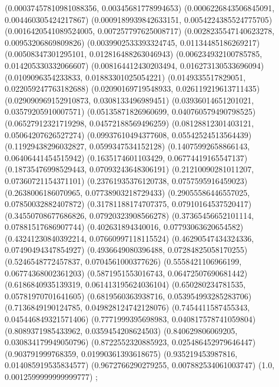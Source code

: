 {\begin{scope}[#1]
{    (0.00037457810981088356, 0.00345681778994653)
    (0.0006226843506845091, 0.004460305424217867)
    (0.0009189939842633151, 0.0054224385524775705)
    (0.0016420541089524005, 0.007257797625008717)
    (0.0028235547140623278, 0.00953206869809826)
    (0.0039902533393324745, 0.01134485186269217)
    (0.00508347301295101, 0.012816488263046943)
    (0.006234932100785785, 0.014205330332066607)
    (0.008164412430203494, 0.016273130533696094)
    (0.0109096354233833, 0.01883301025054221)
    (0.0149335517829051, 0.022059247763182688)
    (0.02090169719548933, 0.026119219613711435)
    (0.029090969152910873, 0.0308133496989451)
    (0.03936014651201021, 0.03579205910007571)
    (0.05135871826960699, 0.040760579490798525)
    (0.06527912321719298, 0.04572188569496259)
    (0.08128812301403121, 0.05064207626527274)
    (0.09937610494377608, 0.05542524513564439)
    (0.11929438296032827, 0.0599347534152128)
    (0.14075992658866143, 0.06406441454515942)
    (0.1635174601103429, 0.06774419165547137)
    (0.18735476998529443, 0.07093243648306191)
    (0.21210090281011207, 0.07360721154371101)
    (0.23761935376120738, 0.0757595916459023)
    (0.2638006186070965, 0.07738903218729433)
    (0.29055586446557025, 0.07850032882407872)
    (0.31781188174707375, 0.07910164537520417)
    (0.34550708677686826, 0.07920323908566278)
    (0.37365456652101114, 0.07881517686907744)
    (0.402631894340016, 0.07793063620654582)
    (0.43241230840392214, 0.07660997118115524)
    (0.46290547434324336, 0.07490494347854927)
    (0.4936649080396488, 0.07284825058170255)
    (0.5246548772457837, 0.0704561000377626)
    (0.5558421106966199, 0.06774368002361203)
    (0.5871951553016743, 0.06472507690681442)
    (0.6186840935139319, 0.061413195624036104)
    (0.650280234781535, 0.05781970701641605)
    (0.6819560363938716, 0.053954993285283706)
    (0.7136849190124785, 0.049828124742128076)
    (0.7454411587455343, 0.045446849321571406)
    (0.7771999395698983, 0.040817578741059804)
    (0.8089371985433962, 0.0359454208624503)
    (0.840629806069205, 0.030834179949050796)
    (0.8722552320885923, 0.025486452979646447)
    (0.903791999768359, 0.01990361393618675)
    (0.935219453987816, 0.014085919535834577)
    (0.9672766290279255, 0.007882534061003747)
    (1.0, 0.0012599999999999777)
  };
\end{scope}
}
